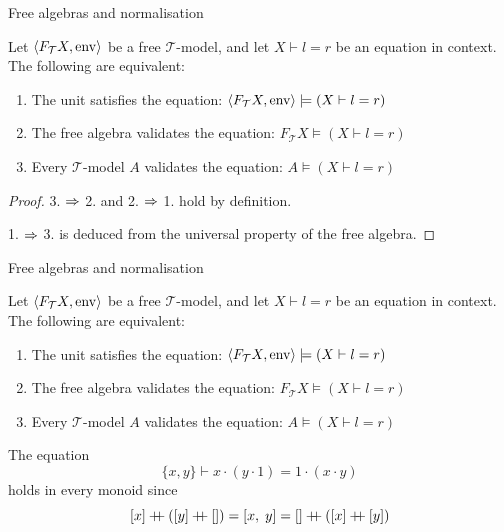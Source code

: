 \documentclass[10pt, english, xcolor={dvipsnames}]{beamer}
\begin{document}

\begin{frame}[t]{Free algebras and normalisation}
  \begin{theorem}
    Let $\left\langle F_\mathcal{T}X, \operatorname{env} \right\rangle$ be a free $\mathcal{T}$-model, and let $X \vdash l = r$ be an equation in context. The following are equivalent:
    \begin{enumerate}
      \item The unit satisfies the equation: $\left\langle F_\mathcal{T}X, \operatorname{env} \right\rangle \models (X \vdash l = r)$
      \item The free algebra validates the equation: $F_\mathcal{T}X \models (X \vdash l = r)$
      \item Every $\mathcal{T}$-model $A$ validates the equation: $A \models (X \vdash l = r)$
    \end{enumerate}
  \end{theorem}
  \begin{proof}
    3. $\Rightarrow$ 2. and 2. $\Rightarrow$ 1. hold by definition.
  
    1. $\Rightarrow$ 3. is deduced from the universal property of the free algebra.
  \end{proof}
\end{frame}

\begin{frame}[t]{Free algebras and normalisation}
  \begin{theorem}
    Let $\left\langle F_\mathcal{T}X, \operatorname{env} \right\rangle$ be a free $\mathcal{T}$-model, and let $X \vdash l = r$ be an equation in context. The following are equivalent:
    \begin{enumerate}
      \item The unit satisfies the equation: $\left\langle F_\mathcal{T}X, \operatorname{env} \right\rangle \models (X \vdash l = r)$
      \item The free algebra validates the equation: $F_\mathcal{T}X \models (X \vdash l = r)$
      \item Every $\mathcal{T}$-model $A$ validates the equation: $A \models (X \vdash l = r)$
    \end{enumerate}
  \end{theorem}


  The equation $$\{x, y\} \vdash x \cdot (y \cdot 1) = 1 \cdot (x \cdot y)$$ holds in every monoid since $$[x] \mathbin{+\mkern-7mu+} ([y] \mathbin{+\mkern-7mu+} []) = [x,\; y] = [] \mathbin{+\mkern-7mu+} ([x] \mathbin{+\mkern-7mu+} [y])$$
\end{frame}
\end{document}
